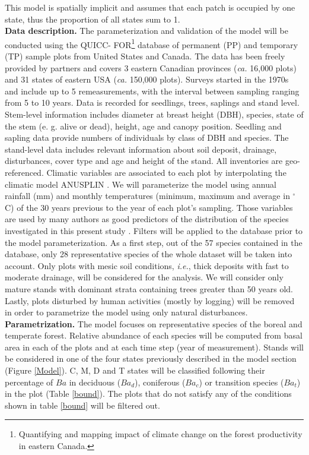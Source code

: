 This model is spatially implicit and assumes that each patch is occupied by
one state, thus the proportion of all states sum to 1. \\

\textbf{Data description.} The parameterization and validation of the model
will be conducted using the QUICC- FOR\footnote{Quantifying and mapping impact
of climate change on the forest productivity in eastern Canada.} database of
permanent (PP) and temporary (TP) sample plots from United States and Canada.
The data has been freely provided by partners and covers 3 eastern Canadian
provinces (\textit{ca.} 16,000 plots) and 31 states of eastern USA
(\textit{ca.} 150,000 plots). Surveys started in the 1970s and include up to 5
remeasurements, with the interval between sampling ranging from 5 to 10 years.
Data is recorded for seedlings, trees, saplings and stand level. Stem-level
information includes diameter at breast height (DBH), species, state of the
stem (e. g. alive or dead), height, age and canopy position. Seedling and
sapling data provide numbers of individuals by class of DBH and species. The
stand-level data includes relevant information about soil deposit, drainage,
disturbances, cover type and age and height of the stand. All  inventories are
geo-referenced. Climatic variables are associated to each plot by
interpolating  the climatic model ANUSPLIN \cite{McKenney2011} . We will
parameterize the model using annual rainfall (mm) and monthly temperatures
(minimum, maximum and average in \ensuremath{^\circ}C) of the 30 years
previous to the year of each plot's sampling. Those variables are used by many
authors as good predictors of the distribution of the species investigated in
this present study \cite{Goldblum2010}. Filters will be applied to the
database prior to the model parameterization. As a first step, out of the 57
species contained in the database, only 28 representative species of the whole
dataset will be taken into account. Only plots with mesic soil conditions,
\textit{i.e.}, thick deposits with fast to moderate drainage, will be
considered for the analysis. We will consider only mature stands with dominant
strata containing trees greater than 50 years old. Lastly, plots disturbed by
human activities (mostly by logging) will be removed in order to parametrize
the model using only natural disturbances. \\

\textbf{Parametrization.} The model focuses on representative species of the
boreal and temperate forest. Relative  abundance of each species will be
computed from basal area in each of the plots and at each time step (year of
measurement). Stands will be considered in one of the four states previously
described in the model section (Figure \ref{Model}). C, M, D and T states will
be classified following their percentage of $Ba$ in deciduous ($Ba_d$),
coniferous ($Ba_c$) or transition species ($Ba_t$) in the plot (Table
\ref{bound}). The plots that do not satisfy any of the conditions shown in
table \ref{bound} will be filtered out.\\

